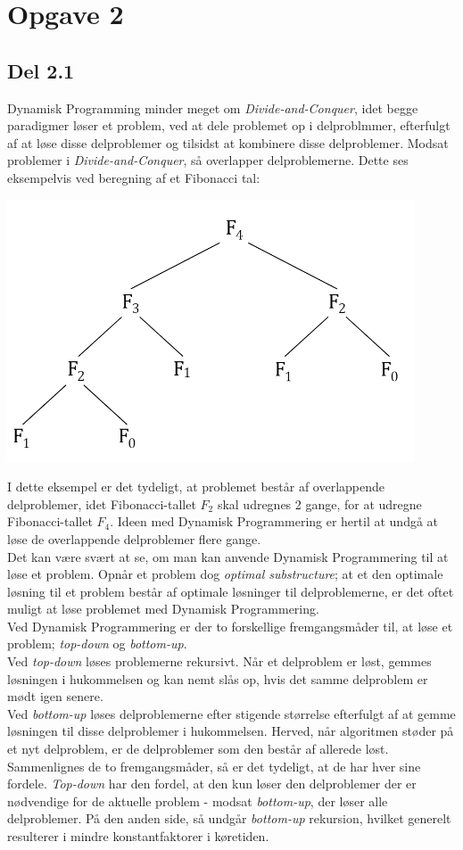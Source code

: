 \documentclass{report}
\begin{document}
\newpage


\section*{Opgave 2}
\subsection*{Del 2.1}
Dynamisk Programming minder meget om \textit{Divide-and-Conquer}, idet begge paradigmer løser et problem, ved at dele problemet op i delproblmmer, efterfulgt af at løse disse delproblemer og tilsidst at kombinere disse delproblemer. Modsat problemer i \textit{Divide-and-Conquer}, så overlapper delproblemerne. Dette ses eksempelvis ved beregning af et Fibonacci tal:
\begin{center}
    \includegraphics[height = 4 cm]{../entities/DP_fibonacci.PNG}
\end{center}
I dette eksempel er det tydeligt, at problemet består af overlappende delproblemer, idet Fibonacci-tallet $F_2$ skal udregnes 2 gange, for at udregne Fibonacci-tallet $F_4$. Ideen med Dynamisk Programmering er hertil at undgå at løse de overlappende delproblemer flere gange. \\
Det kan være svært at se, om man kan anvende Dynamisk Programmering til at løse et problem. Opnår et problem dog \textit{optimal substructure}; at et den optimale løsning til et problem består af optimale løsninger til delproblemerne, er det oftet muligt at løse problemet med Dynamisk Programmering. \\
Ved Dynamisk Programmering er der to forskellige fremgangsmåder til, at løse et problem; \textit{top-down} og \textit{bottom-up}. \\
Ved \textit{top-down} løses problemerne rekursivt. Når et delproblem er løst, gemmes løsningen i hukommelsen og kan nemt slås op, hvis det samme delproblem er mødt igen senere. \\
Ved \textit{bottom-up} løses delproblemerne efter stigende størrelse efterfulgt af at gemme løsningen til disse delproblemer i hukommelsen. Herved, når algoritmen støder på et nyt delproblem, er de delproblemer som den består af allerede løst. \\
Sammenlignes de to fremgangsmåder, så er det tydeligt, at de har hver sine fordele. \textit{Top-down} har den fordel, at den kun løser den delproblemer der er nødvendige for de aktuelle problem - modsat \textit{bottom-up}, der løser alle delproblemer. På den anden side, så undgår \textit{bottom-up} rekursion, hvilket generelt resulterer i mindre konstantfaktorer i køretiden.
\end{document}
